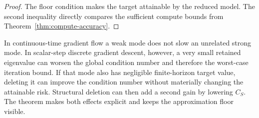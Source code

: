 \begin{proof}
The floor condition makes the target attainable by the reduced model. The second inequality directly compares the sufficient compute bounds from Theorem~\ref{thm:compute-accuracy}.
\end{proof}

\begin{remark}
In continuous-time gradient flow a weak mode does not slow an unrelated strong mode. In scalar-step discrete gradient descent, however, a very small retained eigenvalue can worsen the global condition number and therefore the worst-case iteration bound. If that mode also has negligible finite-horizon target value, deleting it can improve the condition number without materially changing the attainable risk. Structural deletion can then add a second gain by lowering $C_S$. The theorem makes both effects explicit and keeps the approximation floor visible.
\end{remark}
